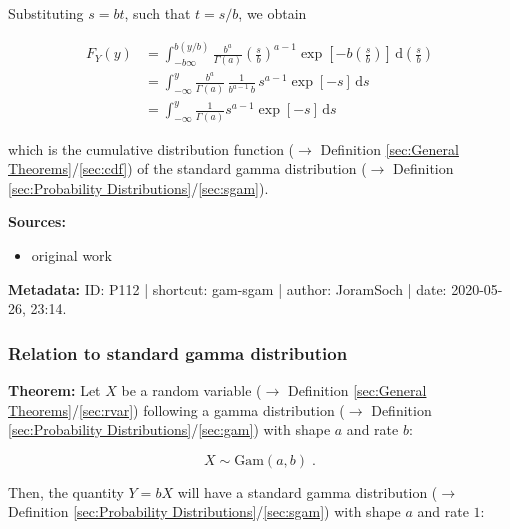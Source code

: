 \documentclass[a4paper,12pt,twoside]{book}
\begin{document}
Substituting $s = b t$, such that $t = s/b$, we obtain

\begin{equation} \label{eq:gam-sgam-Z-cdf-s2}
\begin{split}
F_Y(y) &= \int_{-b \infty}^{b (y/b)} \frac{b^a}{\Gamma(a)} \left(\frac{s}{b}\right)^{a-1} \exp\left[-b \left(\frac{s}{b}\right)\right] \, \mathrm{d}\left(\frac{s}{b}\right) \\
&= \int_{-\infty}^{y} \frac{b^a}{\Gamma(a)} \, \frac{1}{b^{a-1} \, b} \, s^{a-1} \exp[-s] \, \mathrm{d}s \\
&= \int_{-\infty}^{y} \frac{1}{\Gamma(a)} s^{a-1} \exp[-s] \, \mathrm{d}s
\end{split}
\end{equation}

which is the cumulative distribution function ($\rightarrow$ Definition \ref{sec:General Theorems}/\ref{sec:cdf}) of the standard gamma distribution ($\rightarrow$ Definition \ref{sec:Probability Distributions}/\ref{sec:sgam}).


\vspace{1em}
\textbf{Sources:}
\begin{itemize}
\item original work\end{itemize}


\vspace{1em}
\textbf{Metadata:} ID: P112 | shortcut: gam-sgam | author: JoramSoch | date: 2020-05-26, 23:14.
\vspace{1em}



\subsubsection[\textbf{Relation to standard gamma distribution}]{Relation to standard gamma distribution} \label{sec:gam-sgam2}
\setcounter{equation}{0}

\textbf{Theorem:} Let $X$ be a random variable ($\rightarrow$ Definition \ref{sec:General Theorems}/\ref{sec:rvar}) following a gamma distribution ($\rightarrow$ Definition \ref{sec:Probability Distributions}/\ref{sec:gam}) with shape $a$ and rate $b$:

\begin{equation} \label{eq:gam-sgam2-X-gam}
X \sim \mathrm{Gam}(a,b) \; .
\end{equation}

Then, the quantity $Y = b X$ will have a standard gamma distribution ($\rightarrow$ Definition \ref{sec:Probability Distributions}/\ref{sec:sgam}) with shape $a$ and rate $1$:
\end{document}
